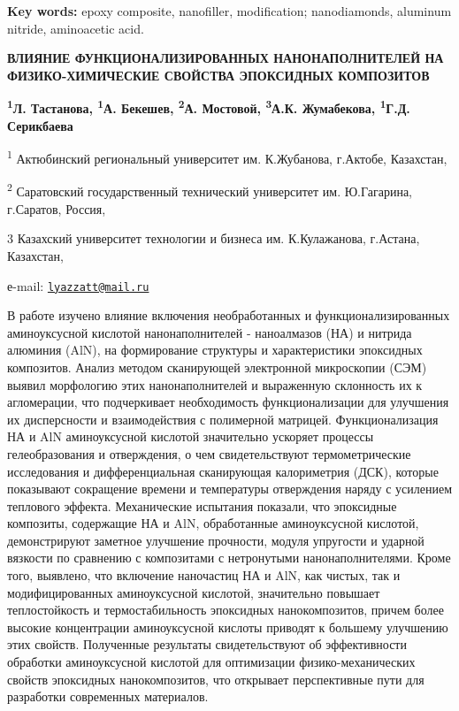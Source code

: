{\bfseries Key words:} epoxy composite, nanofiller, modification;
nanodiamonds, aluminum nitride, aminoacetic acid.

{\bfseries ВЛИЯНИЕ ФУНКЦИОНАЛИЗИРОВАННЫХ НАНОНАПОЛНИТЕЛЕЙ НА
ФИЗИКО-ХИМИЧЕСКИЕ СВОЙСТВА ЭПОКСИДНЫХ КОМПОЗИТОВ}

{\bfseries \textsuperscript{1}Л. Тастанова\textsuperscript{\envelope },
\textsuperscript{1}А. Бекешев, \textsuperscript{2}А. Мостовой,
\textsuperscript{3}А.К. Жумабекова, \textsuperscript{1}Г.Д. Серикбаева}

\textsuperscript{1} Актюбинский региональный университет им. К.Жубанова,
г.Актобе, Казахстан,

\textsuperscript{2} Саратовский государственный технический университет
им. Ю.Гагарина, г.Саратов, Россия,

3 Казахский университет технологии и бизнеса им. К.Кулажанова, г.Астана,
Казахстан,

е-mail: \href{mailto:lyazzatt@mail.ru}{\nolinkurl{lyazzatt@mail.ru}}

В работе изучено влияние включения необработанных и
функционализированных аминоуксусной кислотой нанонаполнителей -
наноалмазов (НА) и нитрида алюминия (AlN), на формирование структуры и
характеристики эпоксидных композитов. Анализ методом сканирующей
электронной микроскопии (СЭМ) выявил морфологию этих нанонаполнителей и
выраженную склонность их к агломерации, что подчеркивает необходимость
функционализации для улучшения их дисперсности и взаимодействия с
полимерной матрицей. Функционализация НА и AlN аминоуксусной кислотой
значительно ускоряет процессы гелеобразования и отверждения, о чем
свидетельствуют термометрические исследования и дифференциальная
сканирующая калориметрия (ДСК), которые показывают сокращение времени и
температуры отверждения наряду с усилением теплового эффекта.
Механические испытания показали, что эпоксидные композиты, содержащие НА
и AlN, обработанные аминоуксусной кислотой, демонстрируют заметное
улучшение прочности, модуля упругости и ударной вязкости по сравнению с
композитами с нетронутыми нанонаполнителями. Кроме того, выявлено, что
включение наночастиц НА и AlN, как чистых, так и модифицированных
аминоуксусной кислотой, значительно повышает теплостойкость и
термостабильность эпоксидных нанокомпозитов, причем более высокие
концентрации аминоуксусной кислоты приводят к большему улучшению этих
свойств. Полученные результаты свидетельствуют об эффективности
обработки аминоуксусной кислотой для оптимизации физико-механических
свойств эпоксидных нанокомпозитов, что открывает перспективные пути для
разработки современных материалов.

